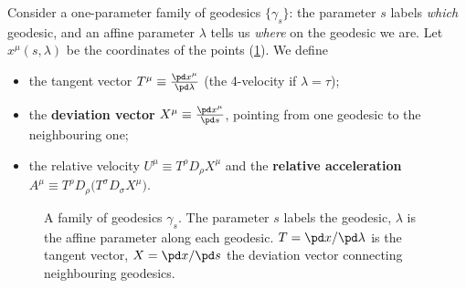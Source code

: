 Consider a one-parameter family of geodesics $\{\gamma_s\}$: the parameter $s$ labels \emph{which} geodesic, and an affine parameter $\lambda$ tells us \emph{where} on the geodesic we are. Let $x^\mu(s,\lambda)$ be the coordinates of the points (\cref{fig:deviation}). We define
\begin{itemize}[nosep]
  \item the tangent vector $T^\mu\equiv\frac{\pd x^\mu}{\pd\lambda}$ (the 4-velocity if $\lambda=\tau$);
  \item the \textbf{deviation vector} $X^\mu\equiv\frac{\pd x^\mu}{\pd s}$, pointing from one geodesic to the neighbouring one;
  \item the relative velocity $U^\mu\equiv T^\rho D_\rho X^\mu$ and the \textbf{relative acceleration} $A^\mu\equiv T^\rho D_\rho\big(T^\sigma D_\sigma X^\mu\big)$.
\end{itemize}

\begin{figure}[ht]
\centering
{}
\caption{A family of geodesics $\gamma_s$. The parameter $s$ labels the geodesic, $\lambda$ is the affine parameter along each geodesic. $T=\pd x/\pd\lambda$ is the tangent vector, $X=\pd x/\pd s$ the deviation vector connecting neighbouring geodesics.}
\label{fig:deviation}
\end{figure}

